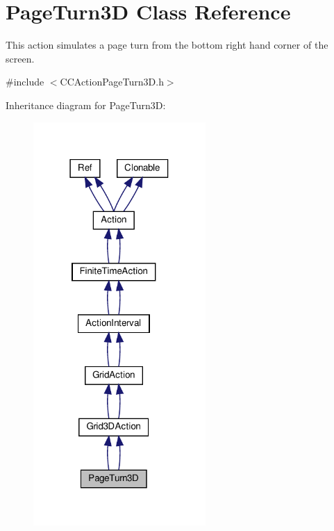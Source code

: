 \hypertarget{classPageTurn3D}{}\section{Page\+Turn3D Class Reference}
\label{classPageTurn3D}


This action simulates a page turn from the bottom right hand corner of the screen.  




{\ttfamily \#include $<$C\+C\+Action\+Page\+Turn3\+D.\+h$>$}



Inheritance diagram for Page\+Turn3D\+:
\nopagebreak
\begin{figure}[H]
\begin{center}
\leavevmode
\includegraphics[width=186pt]{classPageTurn3D__inherit__graph}
\end{center}
\end{figure}


